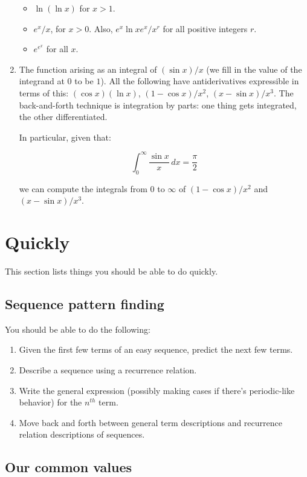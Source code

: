 \documentclass[10pt]{amsart}
\begin{document}
\begin{enumerate}
  \begin{itemize}
  \item $\ln(\ln x)$ for $x > 1$.
  \item $e^x/x$, for $x > 0$. Also, $e^x\ln x$$e^x/x^r$ for all
    positive integers $r$.
  \item $e^{e^x}$ for all $x$.
  \end{itemize}

\item The function arising as an integral of $(\sin x)/x$ (we fill in
  the value of the integrand at $0$ to be $1$). All the following have
  antiderivatives expressible in terms of this: $(\cos x)(\ln x)$, $(1
  - \cos x)/x^2$, $(x - \sin x)/x^3$. The back-and-forth technique is
  integration by parts: one thing gets integrated, the other
  differentiated.

  In particular, given that:

  $$\int_0^\infty \frac{\sin x}{x} \, dx = \frac{\pi}{2}$$

  we can compute the integrals from $0$ to $\infty$ of $(1 - \cos
  x)/x^2$ and $(x - \sin x)/x^3$.
\end{enumerate}

\section{Quickly}

This section lists things you should be able to do quickly.

\subsection{Sequence pattern finding}

You should be able to do the following:

\begin{enumerate}
\item Given the first few terms of an easy sequence, predict the next
  few terms.
\item Describe a sequence using a recurrence relation.
\item Write the general expression (possibly making cases if there's
  periodic-like behavior) for the $n^{th}$ term.
\item Move back and forth between general term descriptions and
  recurrence relation descriptions of sequences.
\end{enumerate}

\subsection{Our common values}
\end{document}
